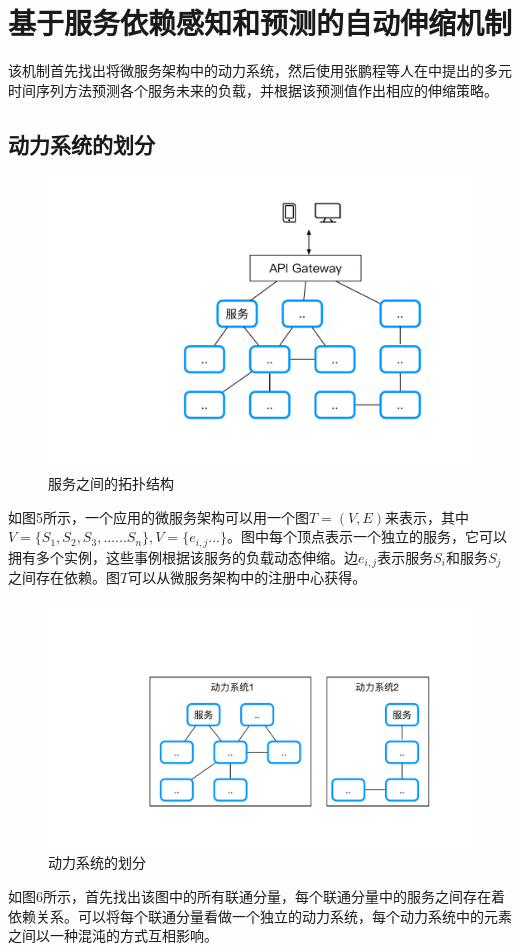 \documentclass[10.5pt,twocolumn]{jbuaa}
\begin{document}
\section{基于服务依赖感知和预测的自动伸缩机制}
该机制首先找出将微服务架构中的动力系统，然后使用张鹏程等人在\cite{Service2018}中提出的多元时间序列方法预测各个服务未来的负载，并根据该预测值作出相应的伸缩策略。
\subsection{动力系统的划分}
\begin{figure}[H]
\centering
\includegraphics [scale=0.4,trim=0 0 0 0]{./image/5.pdf}
\caption{服务之间的拓扑结构}
\end{figure}
如图5所示，一个应用的微服务架构可以用一个图$T=(V,E)$来表示，其中$V=\{S_1,S_2,S_3,......S_n\}, V=\{e_{i,j}...\}$。图中每个顶点表示一个独立的服务，它可以拥有多个实例，这些事例根据该服务的负载动态伸缩。边$e_{i,j}$表示服务$S_i$和服务$S_j$之间存在依赖。图$T$可以从微服务架构中的注册中心获得。
\begin{figure}[H]
\centering
\includegraphics [scale=0.4,trim=0 0 0 0]{./image/6.pdf}
\caption{动力系统的划分}
\end{figure}
如图6所示，首先找出该图中的所有联通分量，每个联通分量中的服务之间存在着依赖关系。可以将每个联通分量看做一个独立的动力系统，每个动力系统中的元素之间以一种混沌的方式互相影响。
\end{document}
